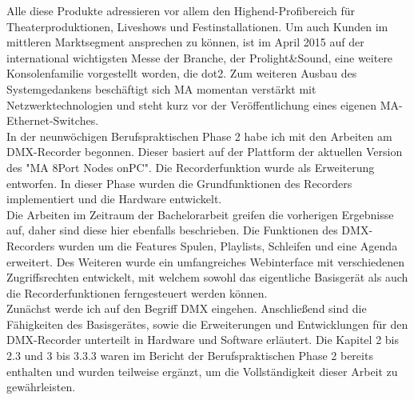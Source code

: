\documentclass[11pt]{scrartcl}
\begin{document}
Alle diese Produkte adressieren vor allem den Highend-Profibereich für Theaterproduktionen,
Liveshows und Festinstallationen. Um auch Kunden im mittleren Marktsegment ansprechen zu
können, ist im April 2015 auf der international wichtigsten Messe der Branche, der Prolight\&Sound,
eine weitere Konsolenfamilie vorgestellt worden, die dot2. Zum weiteren Ausbau des
Systemgedankens beschäftigt sich MA momentan verstärkt mit Netzwerktechnologien und steht kurz
vor der Veröffentlichung eines eigenen MA-Ethernet-Switches.\\
In der neunwöchigen Berufspraktischen Phase 2 habe ich mit den Arbeiten am DMX-Recorder
begonnen. Dieser basiert auf der Plattform der aktuellen Version des "MA 8Port Nodes onPC". Die
Recorderfunktion wurde als Erweiterung entworfen. In dieser Phase wurden die Grundfunktionen
des Recorders implementiert und die Hardware entwickelt.\\
Die Arbeiten im Zeitraum der Bachelorarbeit greifen die vorherigen Ergebnisse auf, daher sind diese
hier ebenfalls beschrieben. Die Funktionen des DMX-Recorders wurden um die Features Spulen,
Playlists, Schleifen und eine Agenda erweitert. Des Weiteren wurde ein umfangreiches Webinterface
mit verschiedenen Zugriffsrechten entwickelt, mit welchem sowohl das eigentliche Basisgerät als
auch die Recorderfunktionen ferngesteuert werden können.\\
Zunächst werde ich auf den Begriff DMX eingehen. Anschließend sind die Fähigkeiten des
Basisgerätes, sowie die Erweiterungen und Entwicklungen für den DMX-Recorder unterteilt in
Hardware und Software erläutert. Die Kapitel 2 bis 2.3 und 3 bis 3.3.3 waren im Bericht der
Berufspraktischen Phase 2 bereits enthalten und wurden teilweise ergänzt, um die Vollständigkeit
dieser Arbeit zu gewährleisten.\\
\end{document}
